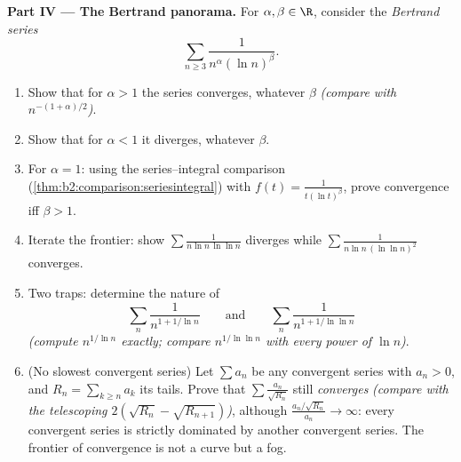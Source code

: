 \begin{problem}[{Weekend problem --- $\zeta(2) = \pi^2/6$ and the
Bertrand panorama}]
\medskip
\noindent\textbf{Part IV --- The Bertrand panorama.} For $\alpha,
\beta \in \R$, consider the \emph{Bertrand series}
\[
\sum_{n \geq 3} \frac{1}{n^{\alpha}(\ln n)^{\beta}} .
\]
\begin{enumerate}[resume]
  \item Show that for $\alpha > 1$ the series converges,
        whatever $\beta$ \emph{(compare with
        $n^{-(1+\alpha)/2}$)}.
  \item Show that for $\alpha < 1$ it diverges, whatever
        $\beta$.
  \item For $\alpha = 1$: using the series--integral comparison
        (\cref{thm:b2:comparison:seriesintegral}) with $f(t) =
        \frac{1}{t(\ln t)^\beta}$, prove convergence iff $\beta
        > 1$.
  \item Iterate the frontier: show $\sum\frac{1}{n\ln n\,\ln\ln
        n}$ diverges while $\sum\frac{1}{n\ln n\,(\ln\ln n)^2}$
        converges.
  \item Two traps: determine the nature of
        \[
        \sum_n \frac{1}{n^{1 + 1/\ln n}}
        \qquad\text{and}\qquad
        \sum_n \frac{1}{n^{1 + 1/\ln\ln n}}
        \]
        \emph{(compute $n^{1/\ln n}$ exactly; compare
        $n^{1/\ln\ln n}$ with every power of $\ln n$)}.
  \item (No slowest convergent series) Let $\sum a_n$ be any
        convergent series with $a_n > 0$, and $R_n = \sum_{k
        \geq n}a_k$ its tails. Prove that $\sum
        \frac{a_n}{\sqrt{R_n}}$ still \emph{converges}
        \emph{(compare with the telescoping $2(\sqrt{R_n} -
        \sqrt{R_{n+1}})$)}, although $\frac{a_n/\sqrt{R_n}}{a_n}
        \to \infty$: every convergent series is strictly
        dominated by another convergent series. The frontier of
        convergence is not a curve but a fog.
\end{enumerate}


\end{problem}

